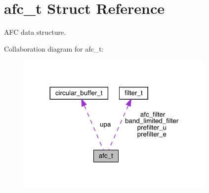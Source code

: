 \hypertarget{structafc__t}{}\section{afc\+\_\+t Struct Reference}
\label{structafc__t}


A\+FC data structure.  




Collaboration diagram for afc\+\_\+t\+:\nopagebreak
\begin{figure}[H]
\begin{center}
\leavevmode
\includegraphics[width=275pt]{structafc__t__coll__graph}
\end{center}
\end{figure}
